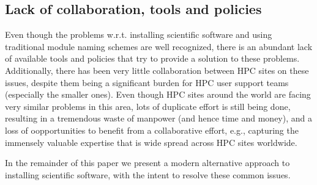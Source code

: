 \subsection{Lack of collaboration, tools and policies}
\label{sec:traditional_lack}

Even though the problems w.r.t. installing scientific software and using
traditional module naming schemes are well recognized, there is an abundant lack
of available tools and policies that try to provide a solution to these problems.
Additionally, there has been very little collaboration between HPC sites on these
issues, despite them being a significant burden for HPC user support teams
(especially the smaller ones). Even though HPC sites around the world are facing
very similar problems in this area, lots of duplicate effort is still being done,
resulting in a tremendous waste of manpower (and hence time and money), and a loss
of oopportunities to benefit from a collaborative effort, e.g., capturing the
immensely valuable expertise that is wide spread across HPC sites worldwide.

In the remainder of this paper we present a modern alternative approach to
installing scientific software, with the intent to resolve these common issues.


